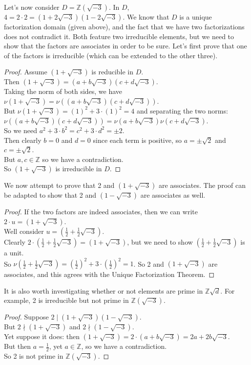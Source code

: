 \documentclass[11pt]{amsart}
\theoremstyle{definition}
\newcommand{\integers}{\mathbb{Z}}
\newcommand{\zd}{\mathbb{Z}\sqrt{d}} %
\begin{document}
Let's now consider $D = \integers(\sqrt{-3})$. In $D$, $4 = 2 \cdot 2 = (1 + 2\sqrt{-3})(1-2\sqrt{-3})$. We know that $D$ is a unique factorization
domain (given above), and the fact that we have two factorizations does not contradict it. Both feature two irreducible elements, but we need to
show that the factors are associates in order to be sure. Let's first prove that one of the factors is irreducible (which can be extended to the
other three).
\begin{proof}
	Assume $(1 + \sqrt{-3})$ is reducible in $D$. \\
	Then $(1 + \sqrt{-3}) = (a + b\sqrt{-3})(c + d\sqrt{-3})$. \\
	Taking the norm of both sides, we have $\nu(1 + \sqrt{-3}) = \nu((a + b\sqrt{-3})(c + d\sqrt{-3}))$. \\
	But $\nu(1 + \sqrt{-3}) = (1)^2 + 3 \cdot (1)^2 = 4$ and separating the two norms: \\
	$\nu((a + b\sqrt{-3})(c + d\sqrt{-3})) = \nu(a + b\sqrt{-3})\nu(c + d\sqrt{-3})$. \\
	So we need $a^2 + 3 \cdot b^2 = c^2 + 3 \cdot d^2 = \pm 2$. \\
	Then clearly $b = 0$ and $d = 0$ since each term is positive, so $a = \pm\sqrt{2}$ and $c = \pm\sqrt{2}$. \\
	But $a, c \in \integers$ so we have a contradiction. \\
	So $(1 + \sqrt{-3})$ is irreducible in $D$.
\end{proof}
We now attempt to prove that 2 and $(1 + \sqrt{-3})$ are associates. The proof can be adapted to show that 2 and $(1 - \sqrt{-3})$ are associates
as well.
\begin{proof}
	If the two factors are indeed associates, then we can write $2 \cdot u = (1 + \sqrt{-3})$. \\
	Well consider $u = (\frac{1}{2} + \frac{1}{2}\sqrt{-3})$. \\
	Clearly $2 \cdot (\frac{1}{2} + \frac{1}{2}\sqrt{-3}) = (1 + \sqrt{-3})$, but we need to show $(\frac{1}{2} + \frac{1}{2}\sqrt{-3})$ is a unit. \\
	So $\nu(\frac{1}{2} + \frac{1}{2}\sqrt{-3})  = (\frac{1}{2})^2 + 3 \cdot (\frac{1}{2})^2 = 1$.
	So 2 and $(1 + \sqrt{-3})$ are associates, and this agrees with the Unique Factorization Theorem.
\end{proof}
It is also worth investigating whether or not elements are prime in $\zd$. For example, 2 is irreducible but not prime in $\integers(\sqrt{-3})$.
\begin{proof}
	Suppose $2 \mid (1 + \sqrt{-3})(1 - \sqrt{-3})$. \\
	But $2 \nmid (1 + \sqrt{-3})$ and $2 \nmid (1 - \sqrt{-3})$. \\
	Yet suppose it does: then $(1 + \sqrt{-3}) = 2 \cdot (a + b\sqrt{-3}) = 2a + 2b\sqrt{-3}$. \\
	But then $a = \frac{1}{2}$, yet $a \in \integers$, so we have a contradiction. \\
	So 2 is not prime in $\integers(\sqrt{-3})$.
\end{proof}
\newpage
	
\end{document}
